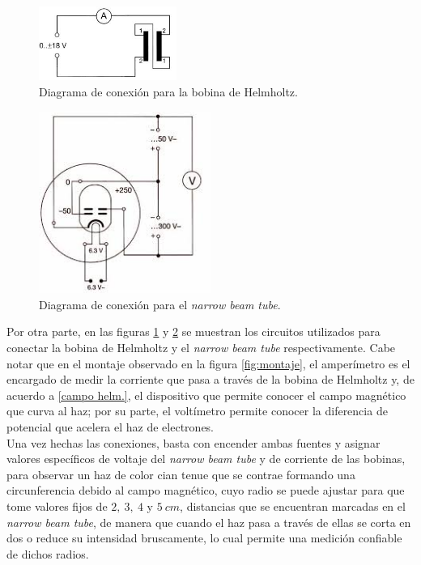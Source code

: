 \documentclass[prb,aps,twocolumn,preprintnumbers,amsmath,amssymb]{revtex4}
\begin{document}
\begin{figure}[h!]
	\centering
	\includegraphics[width=0.4\textwidth,height=0.1\textheight]{helmholtz-coils}
	\caption{Diagrama de conexión para la bobina de Helmholtz.}
	\label{fig:coils}
\end{figure}

\begin{figure}[h!]
	\centering
	\includegraphics[width=0.5\textwidth,height=0.25\textheight]{narrow-beam-tube}
	\caption{Diagrama de conexión para el \textit{narrow beam tube}.}
	\label{fig:tube}
\end{figure}

Por otra parte, en las figuras \ref{fig:coils} y \ref{fig:tube} se muestran los circuitos utilizados para conectar la bobina de Helmholtz y el \textit{narrow beam tube} respectivamente. Cabe notar que en el montaje observado en la figura \ref{fig:montaje}, el amperímetro es el encargado de medir la corriente que pasa a través de la bobina de Helmholtz y, de acuerdo a \eqref{campo helm.}, el dispositivo que permite conocer el campo magnético que curva al haz; por su parte, el voltímetro permite conocer la diferencia de potencial que acelera el haz de electrones.\\

Una vez hechas las conexiones, basta con encender ambas fuentes y asignar valores específicos de voltaje del \textit{narrow beam tube} y de corriente de las bobinas, para observar un haz de color cian tenue que se contrae formando una circunferencia debido al campo magnético, cuyo radio se puede ajustar para que tome valores fijos de $2,\ 3,\ 4$ y $5\ cm$, distancias que se encuentran marcadas en el \textit{narrow beam tube}, de manera que cuando el haz pasa a través de ellas se corta en dos o reduce su intensidad bruscamente, lo cual permite una medición confiable de dichos radios.\\\\\\\\\\\\
\end{document}
